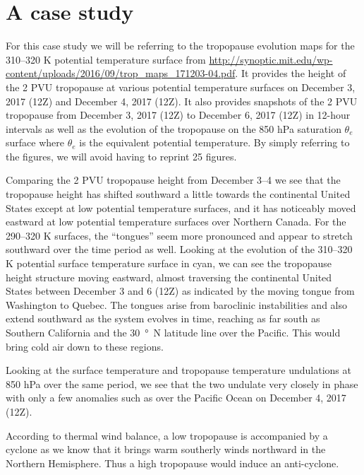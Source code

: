 \documentclass[11pt]{article}
\begin{document}
\section{A case study}
For this case study we will be referring to the tropopause evolution maps for the 310--320 K potential temperature surface from \url{http://synoptic.mit.edu/wp-content/uploads/2016/09/trop_maps_171203-04.pdf}. It provides the height of the 2 PVU tropopause at various potential temperature surfaces on December 3, 2017 (12Z) and December 4, 2017 (12Z). It also provides snapshots of the 2 PVU tropopause from December 3, 2017 (12Z) to December 6, 2017 (12Z) in 12-hour intervals as well as the evolution of the tropopause on the 850 hPa saturation $\theta_e$ surface where $\theta_e$ is the equivalent potential temperature. By simply referring to the figures, we will avoid having to reprint 25 figures.

Comparing the 2 PVU tropopause height from December 3--4 we see that the tropopause height has shifted southward a little towards the continental United States except at low potential temperature surfaces, and it has noticeably moved eastward at low potential temperature surfaces over Northern Canada. For the 290--320 K surfaces, the ``tongues'' seem more pronounced and appear to stretch southward over the time period as well. Looking at the evolution of the 310--320 K potential surface temperature surface in cyan, we can see the tropopause height structure moving eastward, almost traversing the continental United States between December 3 and 6 (12Z) as indicated by the moving tongue from Washington to Quebec. The tongues arise from baroclinic instabilities and also extend southward as the system evolves in time, reaching as far south as Southern California and the \SI{30}{\degree N} latitude line over the Pacific. This would bring cold air down to these regions.

Looking at the surface temperature and tropopause temperature undulations at 850 hPa over the same period, we see that the two undulate very closely in phase with only a few anomalies such as over the Pacific Ocean on December 4, 2017 (12Z).

According to thermal wind balance, a low tropopause is accompanied by a cyclone as we know that it brings warm southerly winds northward in the Northern Hemisphere. Thus a high tropopause would induce an anti-cyclone.

\end{document}
